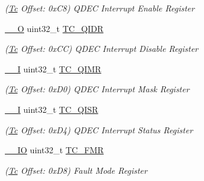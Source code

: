 \begin{DoxyCompactItemize}
\begin{DoxyCompactList}\small\item\em (\mbox{\hyperlink{structTc}{Tc}} Offset\+: 0x\+C8) Q\+D\+EC Interrupt Enable Register \end{DoxyCompactList}\item 
\mbox{\label{structTc_a4d94aeb6db2d212dc5b8b041d033e23d}} 
\mbox{\hyperlink{core__cm7_8h_a7e25d9380f9ef903923964322e71f2f6}{\+\_\+\+\_\+O}} uint32\+\_\+t \mbox{\hyperlink{structTc_a4d94aeb6db2d212dc5b8b041d033e23d}{T\+C\+\_\+\+Q\+I\+DR}}
\begin{DoxyCompactList}\small\item\em (\mbox{\hyperlink{structTc}{Tc}} Offset\+: 0x\+CC) Q\+D\+EC Interrupt Disable Register \end{DoxyCompactList}\item 
\mbox{\label{structTc_a816446778b9add8aa4ade9dbc7bba5e5}} 
\mbox{\hyperlink{core__cm7_8h_af63697ed9952cc71e1225efe205f6cd3}{\+\_\+\+\_\+I}} uint32\+\_\+t \mbox{\hyperlink{structTc_a816446778b9add8aa4ade9dbc7bba5e5}{T\+C\+\_\+\+Q\+I\+MR}}
\begin{DoxyCompactList}\small\item\em (\mbox{\hyperlink{structTc}{Tc}} Offset\+: 0x\+D0) Q\+D\+EC Interrupt Mask Register \end{DoxyCompactList}\item 
\mbox{\label{structTc_afab8e80012810a89f37cea6bb565ecee}} 
\mbox{\hyperlink{core__cm7_8h_af63697ed9952cc71e1225efe205f6cd3}{\+\_\+\+\_\+I}} uint32\+\_\+t \mbox{\hyperlink{structTc_afab8e80012810a89f37cea6bb565ecee}{T\+C\+\_\+\+Q\+I\+SR}}
\begin{DoxyCompactList}\small\item\em (\mbox{\hyperlink{structTc}{Tc}} Offset\+: 0x\+D4) Q\+D\+EC Interrupt Status Register \end{DoxyCompactList}\item 
\mbox{\label{structTc_a1948e26cff45c67052d07b1a9b679356}} 
\mbox{\hyperlink{core__cm7_8h_aec43007d9998a0a0e01faede4133d6be}{\+\_\+\+\_\+\+IO}} uint32\+\_\+t \mbox{\hyperlink{structTc_a1948e26cff45c67052d07b1a9b679356}{T\+C\+\_\+\+F\+MR}}
\begin{DoxyCompactList}\small\item\em (\mbox{\hyperlink{structTc}{Tc}} Offset\+: 0x\+D8) Fault Mode Register \end{DoxyCompactList}\item 

\end{DoxyCompactItemize}
